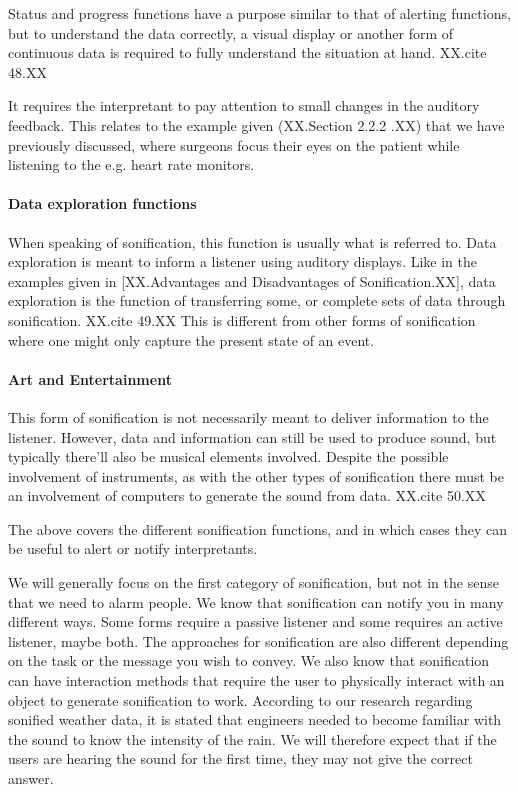 Status and progress functions have a purpose similar to that of alerting functions, but to understand the data correctly, a visual display or another form of continuous data is required to fully understand the situation at hand. XX.cite 48.XX

It requires the interpretant to pay attention to small changes in the auditory feedback. This relates to the example given (XX.Section 2.2.2 .XX) that we have previously discussed, where surgeons focus their eyes on the patient while listening to the e.g. heart rate monitors.




\paragraph{Data exploration functions} %
\label{par:data_exploration_functions}

When speaking of sonification, this function is usually what is referred to. Data exploration is meant to inform a listener using auditory displays. Like in the examples given in [XX.Advantages and Disadvantages of Sonification.XX], data exploration is the function of transferring some, or complete sets of data through sonification. XX.cite 49.XX
This is different from other forms of sonification where one might only capture the present state of an event.



\paragraph{Art and Entertainment} %
\label{par:art_and_entertainment}

This form of sonification is not necessarily meant to deliver information to the listener. However, data and information can still be used to produce sound, but typically there’ll also be musical elements involved. Despite the possible involvement of instruments, as with the other types of sonification there must be an involvement of computers to generate the sound from data. XX.cite 50.XX


The above covers the different sonification functions, and in which cases they can be useful to alert or notify interpretants.

We will generally focus on the first category of sonification, but not in the sense that we need to alarm people.
We know that sonification can notify you in many different ways. Some forms require a passive listener and some requires an active listener, maybe both. The approaches for sonification are also different depending on the task or the message you wish to convey. We also know that sonification can have interaction methods that require the user to physically interact with an object to generate sonification to work. According to our research regarding sonified weather data, it is stated that engineers needed to become familiar with the sound to know the intensity of the rain. We will therefore expect that if the users are hearing the sound for the first time, they may not give the correct answer.

